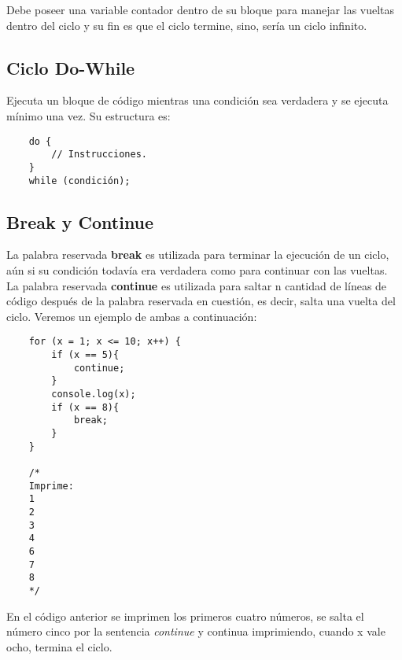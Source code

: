 Debe poseer una variable contador dentro de su bloque para manejar las vueltas dentro del ciclo y su fin es que el ciclo termine, sino, sería un ciclo infinito.


\subsection{Ciclo Do-While}
\hspace{0.55cm}Ejecuta un bloque de código mientras una condición sea verdadera y se ejecuta mínimo una vez. Su estructura es:
\begin{lstlisting}
    do {
        // Instrucciones.
    }
    while (condición);
\end{lstlisting}


\subsection{Break y Continue}
\hspace{0.55cm}La palabra reservada \textbf{break} es utilizada para terminar la ejecución de un ciclo, aún si su condición todavía era verdadera como para continuar con las vueltas.\\
La palabra reservada \textbf{continue} es utilizada para saltar n cantidad de líneas de código después de la palabra reservada en cuestión, es decir, salta una vuelta del ciclo. Veremos un ejemplo de ambas a continuación:
\begin{lstlisting}
    for (x = 1; x <= 10; x++) {
        if (x == 5){
            continue;
        }
        console.log(x);
        if (x == 8){
            break;
        }
    }

    /*
    Imprime:
    1
    2
    3
    4
    6
    7
    8
    */
\end{lstlisting}

En el código anterior se imprimen los primeros cuatro números, se salta el número cinco por la sentencia \textit{continue} y continua imprimiendo, cuando x vale ocho, termina el ciclo.